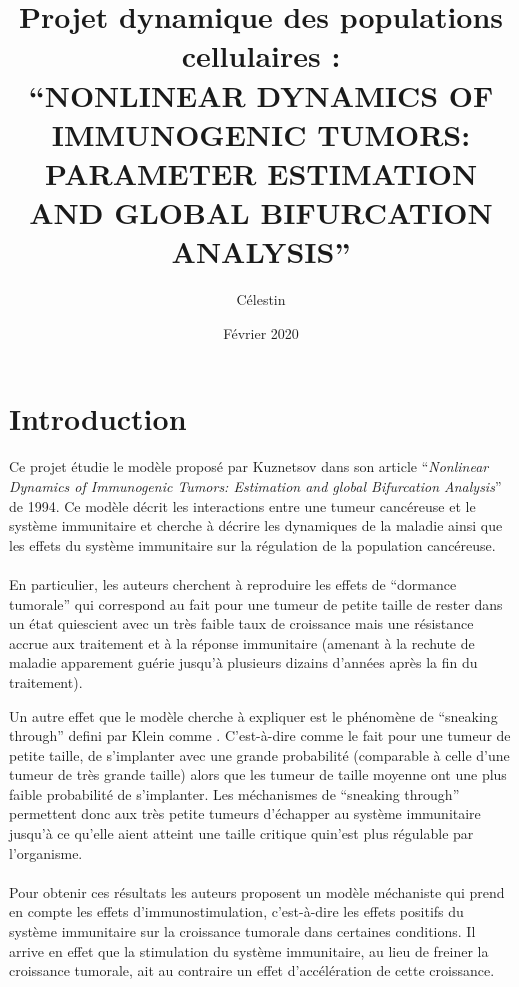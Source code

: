 \documentclass[12pt]{article}
\title{Projet dynamique des populations cellulaires :\\
``NONLINEAR DYNAMICS OF IMMUNOGENIC TUMORS: PARAMETER ESTIMATION AND GLOBAL BIFURCATION ANALYSIS''}
\author{Célestin \bsc{Bigarré}}
\date{Février 2020}
\begin{document}
\maketitle
\section*{Introduction}
Ce projet étudie le modèle proposé par Kuznetsov dans son article ``\emph{Nonlinear  Dynamics of Immunogenic Tumors: Estimation and global Bifurcation Analysis}'' de 1994. Ce modèle décrit les interactions entre une tumeur cancéreuse et le système immunitaire et cherche à décrire les dynamiques de la maladie ainsi que les effets du système immunitaire sur la régulation de la population cancéreuse. 

\paragraph{} En particulier, les auteurs cherchent à reproduire les effets de ``dormance tumorale'' qui correspond au fait pour une tumeur de petite taille de rester dans un état quiescient avec un très faible taux de croissance mais une résistance accrue aux traitement et à la réponse immunitaire (amenant à la rechute de maladie apparement guérie jusqu'à plusieurs dizains d'années après la fin du traitement).

Un autre effet que le modèle cherche à expliquer est le phénomène de ``sneaking through'' defini par Klein \cite{klein_1966} comme . C'est-à-dire comme le fait pour une tumeur de petite taille, de s'implanter avec une grande probabilité (comparable à celle d'une tumeur de très grande taille) alors que les tumeur de taille moyenne ont une plus faible probabilité de s'implanter. Les méchanismes de ``sneaking through'' permettent donc aux très petite tumeurs d'échapper au système immunitaire jusqu'à ce qu'elle aient atteint une taille critique quin'est plus régulable par l'organisme. 

\paragraph{}Pour obtenir ces résultats les auteurs proposent un modèle méchaniste qui prend en compte les effets d'immunostimulation, c'est-à-dire les effets positifs du système immunitaire sur la croissance tumorale dans certaines conditions. Il arrive en effet que la stimulation du système immunitaire, au lieu de freiner la croissance tumorale, ait au contraire un effet d'accélération de cette croissance. 
\end{document}
